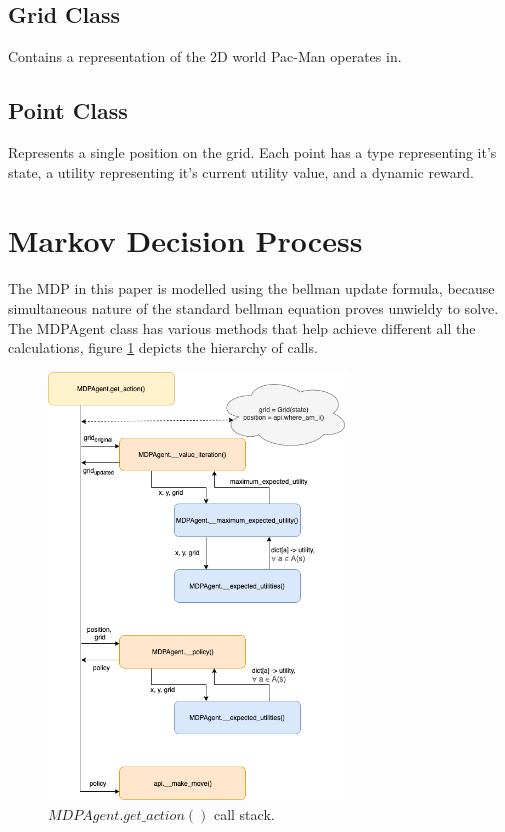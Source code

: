 \documentclass[letterpaper, 11pt, journal, final]{IEEEtran}
\begin{document}
\subsection{Grid Class}
Contains a representation of the 2D world Pac-Man operates in.

\subsection{Point Class}
Represents a single position on the grid. Each point has a type representing it's state, a utility representing it's current utility value, and a dynamic reward.

\section{Markov Decision Process}
The MDP in this paper is modelled using the bellman update\cite{Bel} formula, because simultaneous nature of the standard bellman equation proves unwieldy to solve. The MDPAgent class has various methods that help achieve different all the calculations, figure \ref{fig:mdpgent} depicts the hierarchy of calls.

\begin{figure}[ht]
    \centering
    \includegraphics[width=8cm]{MDPAgent.png}
    \caption{\(MDPAgent.get\_action()\) call stack.}
    \label{fig:mdpgent}
\end{figure}
\end{document}
